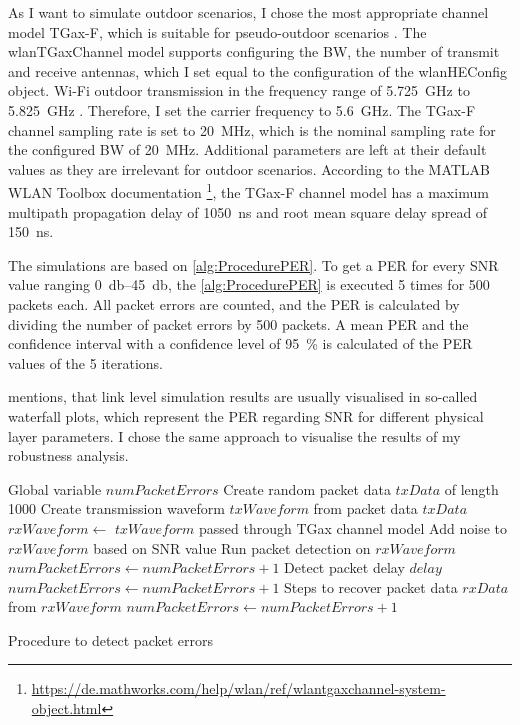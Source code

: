 As I want to simulate outdoor scenarios, I chose the most appropriate channel model TGax-F, which is suitable for pseudo-outdoor scenarios \cite{TGAXCHANNEL}.
The wlanTGaxChannel model supports configuring the \ac{BW}, the number of transmit and receive antennas, which I set equal to the configuration of the wlanHEConfig object.
Wi-Fi outdoor transmission in the frequency range of \SI{5.725}{\giga\hertz} to \SI{5.825}{\giga\hertz} \cite{freq_plan_5G}.
Therefore, I set the carrier frequency to \SI{5.6}{\giga\hertz}.
The TGax-F channel sampling rate is set to \SI{20}{\mega\hertz}, which is the nominal sampling rate for the configured \ac{BW} of \SI{20}{\mega\hertz}.
Additional parameters are left at their default values as they are irrelevant for outdoor scenarios.
According to the MATLAB WLAN Toolbox documentation \footnote{\url{https://de.mathworks.com/help/wlan/ref/wlantgaxchannel-system-object.html}},
the TGax-F channel model has a maximum multipath propagation delay of \SI{1050}{\nano\second} and root mean square delay spread of \SI{150}{\nano\second}.

The simulations are based on \autoref{alg:ProcedurePER}.
To get a \ac{PER} for every \ac{SNR} value ranging \SIrange{0}{45}{\decibel}, the \autoref{alg:ProcedurePER} is executed \num{5} times for \num{500} packets each.
All packet errors are counted, and the \ac{PER} is calculated by dividing the number of packet errors by \num{500} packets.
A mean \ac{PER} and the confidence interval with a confidence level of
\SI{95}{\percent} is calculated of the \ac{PER} values of the \num{5} iterations.

\textcite{omar_survey_2016} mentions, that link level simulation results are usually visualised in so-called waterfall plots, which represent the \ac{PER} regarding \ac{SNR} for
different physical layer parameters.
I chose the same approach to visualise the results of my robustness analysis.

\begin{algorithm}
\begin{algorithmic}[1]
\REQUIRE Global variable $numPacketErrors$
\STATE Create random packet data $txData$ of length \SI{1000}{\byte}
\STATE Create transmission waveform $txWaveform$ from packet data $txData$
\STATE $rxWaveform \gets $ $txWaveform$ passed through TGax channel model
\STATE Add noise to $rxWaveform$ based on \ac{SNR} value
\STATE Run packet detection on $rxWaveform$
    \STATE $numPacketErrors \gets numPacketErrors + 1$
\ENDIF
\STATE Detect packet delay $delay$
    \STATE $numPacketErrors \gets numPacketErrors + 1$
\ENDIF
\STATE Steps to recover packet data $rxData$ from $rxWaveform$
    \STATE $numPacketErrors \gets numPacketErrors + 1$
\ENDIF

\end{algorithmic}
\caption{Procedure to detect packet errors }
\label{alg:ProcedurePER}
\end{algorithm}

